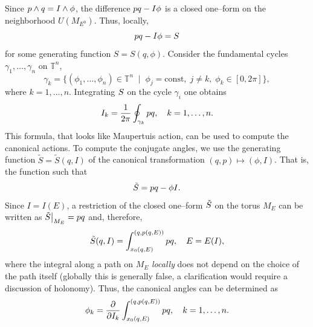 \documentclass[english,fontsize=11pt,paper=a5,oneside]{scrbook}
\newcommand{\T}{\mathbb{T}}
\let\d\relax
\DeclareMathOperator{\d}{d}
\theoremstyle{definition}
\begin{document}
Since $\d p \wedge \d q = \d I \wedge \d \phi$, the difference $p\d q - I\d \phi$ is a closed one--form on the neighborhood $U(M_{E^0})$. Thus, locally,
\begin{equation}
    p\d q - I\d \phi = \d S
\end{equation}
for some generating function $S = S(q,\phi)$.
Consider the fundamental cycles $\gamma_1, \ldots, \gamma_n$ on $\T^n$,
\begin{equation}
    \gamma_k = \big\{
        (\phi_1, \ldots, \phi_n) \in \T^n \;\mid\; \phi_j = \mathrm{const}, \; j\neq k,\; \phi_k \in [0,2\pi]
        \big\},
\end{equation}
where $k=1,\ldots,n$.
Integrating $\d S$ on the cycle $\gamma_i$ one obtains
\begin{equation}
    I_k = \frac1{2\pi} \oint_{\gamma_k} p \d q, \quad k=1,\ldots,n.
\end{equation}
This formula, that looks like Maupertuis action, can be used to compute the canonical actions.
To compute the conjugate angles, we use the generating function $\tilde S = \tilde S(q,I)$ of the canonical transformation $(q,p) \mapsto (\phi, I)$. That is, the function such that
\begin{equation}
    \d\tilde S = p\d q - \phi \d I.
\end{equation}
Since $I = I(E)$, a restriction of the closed one--form $\d\tilde S$ on the torus $M_E$ can be written as $\d\tilde S\big|_{M_E} = p\d q$ and, therefore,
\begin{equation}
    \tilde S(q,I) = \int_{x_0(q,E)}^{(q, p(q,E))} p \d q, \quad E = E(I),
\end{equation}
where the integral along a path on $M_E$ \emph{locally} does not depend on the choice of the path itself (globally this is generally false, a clarification would require a discussion of holonomy).
Thus, the canonical angles can be determined as
\begin{equation}
    \phi_k = \frac{\partial}{\partial I_k} \int_{x_0(q,E)}^{(q, p(q,E))} p \d q, \quad k=1,\ldots,n.
\end{equation}
\end{document}
